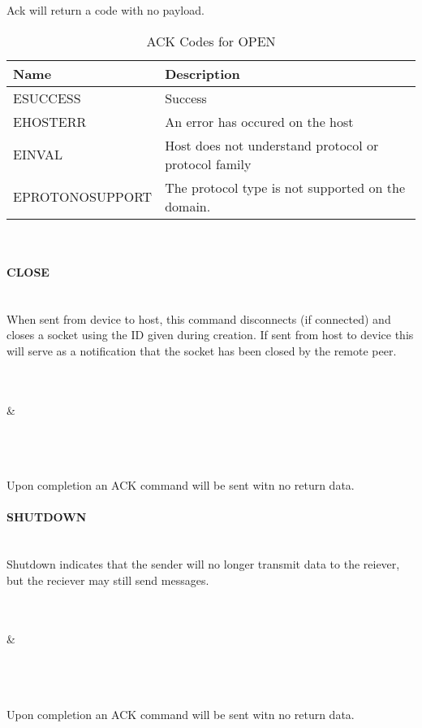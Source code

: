 \documentclass[10pt]{article}
\begin{document}
	Ack will return a code with no payload.
	\begin{table}[H]
		\begin{center}
			\caption{ACK Codes for OPEN}
			\label{tab:openErrTable}
			\begin{tabular}{l|l} 
				\rowcolor{lightgray}
				\textbf{Name} & \textbf{Description}\\
				\hline
				ESUCCESS & Success\\
				EHOSTERR & An error has occured on the host\\
				EINVAL & Host does not understand protocol or protocol family\\
				EPROTONOSUPPORT & The protocol type is not supported on the domain. \\
			\end{tabular}
		\end{center}
	\end{table} \mbox{}\\
	\paragraph{CLOSE} \mbox{}\\
	When sent from device to host, this command disconnects (if connected) and closes a socket using the ID given during creation.
	If sent from host to device this will serve as a notification that the socket has been closed by the remote peer. \\
	\\
	\begin{bytefield}[bitwidth=1.7em]{32}
		 \\
		 &
		 \\
		 \\
		 \\
	\end{bytefield}\\
	Upon completion an ACK command will be sent witn no return data. 
	\\
	\paragraph{SHUTDOWN} \mbox{}\\
	Shutdown indicates that the sender will no longer transmit data to the reiever, but the reciever may still send messages.\\
	\\
	\begin{bytefield}[bitwidth=1.7em]{32}
		 \\
		 &
		 \\
		 \\
		 \\
	\end{bytefield}\\
	Upon completion an ACK command will be sent witn no return data. 
	\\
\end{document}
